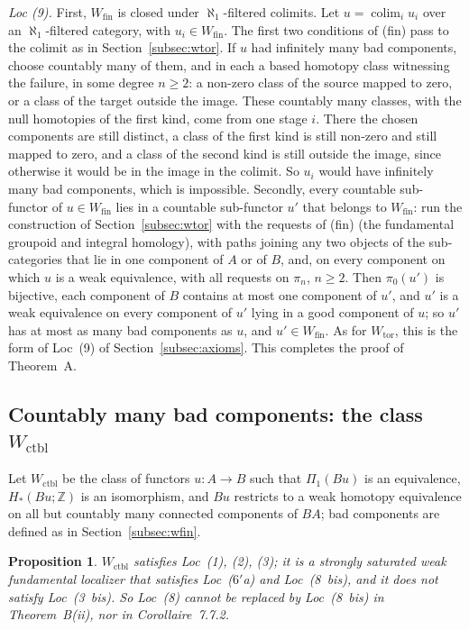 \documentclass[11pt,a4paper]{article}
\newtheorem{proposition}[theorem]{Proposition}
\theoremstyle{definition}
\newcommand{\Wtor}{W_{\mathrm{tor}}}
\newcommand{\Wfin}{W_{\mathrm{fin}}}
\newcommand{\Wctbl}{W_{\mathrm{ctbl}}}
\newcommand{\Z}{\mathbb{Z}}
\newcommand{\colim}{\operatorname*{colim}}
\newcommand{\Pione}{\Pi_1}
\begin{document}
\emph{Loc (9).} First, $\Wfin$ is closed under $\aleph_1$-filtered colimits. Let
$u=\colim_iu_i$ over an $\aleph_1$-filtered category, with $u_i\in\Wfin$. The first two
conditions of (fin) pass to the colimit as in Section~\ref{subsec:wtor}. If $u$ had infinitely
many bad components, choose countably many of them, and in each a based homotopy class
witnessing the failure, in some degree $n\ge2$: a non-zero class of the source mapped to zero,
or a class of the target outside the image. These countably many classes, with the null
homotopies of the first kind, come from one stage $i$. There the chosen components are still
distinct, a class of the first kind is still non-zero and still mapped to zero, and a class of
the second kind is still outside the image, since otherwise it would be in the image in the
colimit. So $u_i$ would have infinitely many bad components, which is impossible. Secondly, every
countable sub-functor of $u\in\Wfin$ lies in a countable sub-functor $u'$ that belongs to
$\Wfin$: run the construction of Section~\ref{subsec:wtor} with the requests of (fin) (the
fundamental groupoid and integral homology), with paths joining any two objects of the
sub-categories that lie in one component of $A$ or of $B$, and, on every component on which $u$
is a weak equivalence, with all requests on $\pi_n$, $n\ge2$. Then $\pi_0(u')$ is bijective,
each component of $B$ contains at most one component of $u'$, and $u'$ is a weak equivalence on
every component of $u'$ lying in a good component of $u$; so $u'$ has at most as many bad
components as $u$, and $u'\in\Wfin$. As for $\Wtor$, this is the form of Loc~(9) of
Section~\ref{subsec:axioms}. This completes the proof of Theorem~A.

\subsection{Countably many bad components: the class \texorpdfstring{$\Wctbl$}{W ctbl}}\label{subsec:wctbl}

Let $\Wctbl$ be the class of functors $u\colon A\to B$ such that $\Pione(Bu)$ is an
equivalence, $H_*(Bu;\Z)$ is an isomorphism, and $Bu$ restricts to a weak homotopy equivalence
on all but countably many connected components of $BA$; bad components are defined as in
Section~\ref{subsec:wfin}.

\begin{proposition}\label{prop:ctbl}
$\Wctbl$ satisfies Loc~\textup{(1)}, \textup{(2)}, \textup{(3)}; it is a strongly saturated weak
fundamental localizer that satisfies Loc~\textup{($6'$a)} and Loc~\textup{(8~bis)}, and it does
not satisfy Loc~\textup{(3~bis)}. So Loc~\textup{(8)} cannot be replaced by
Loc~\textup{(8~bis)} in Theorem~B\textup{(ii)}, nor in Corollaire~7.7.2.
\end{proposition}
\end{document}
